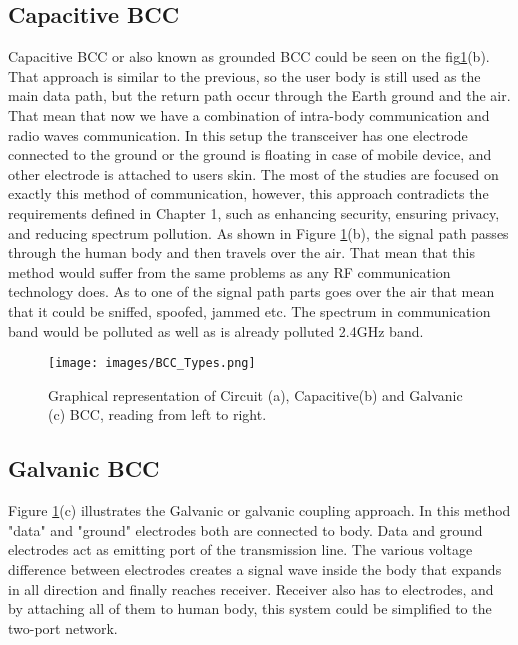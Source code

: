 {\begin{table}
\begin{minipage}[b]{\hsize}
      \label{tab:comparing_solutions} 
      \end{minipage}
\end{table}


\subsection{Capacitive BCC}




\quad Capacitive BCC or also known as grounded BCC could be seen on the fig\ref{fig:bcc_types}(b). That approach is similar to the previous, so the user body is still used as the main data path, but the return path occur through the Earth ground and the air. That mean that now we have a combination of intra-body communication and radio waves communication. In this setup the transceiver has one electrode connected to the ground or the ground is floating in case of mobile device, and other electrode is attached to users skin. The most of the studies are focused on exactly this method of communication, however, this approach contradicts the requirements defined in Chapter 1, such as enhancing security, ensuring privacy, and reducing spectrum pollution. As shown in Figure \ref{fig:bcc_types}(b), the signal path passes through the human body and then travels over the air. That mean that this method would suffer from the same problems as any RF communication technology does. As to one of the signal path parts goes over the air that mean that it could be sniffed, spoofed, jammed etc. The spectrum in communication band would be polluted as well as is already polluted 2.4GHz band.





\begin{figure}[!h]
    \centering
    \texttt{[image: images/BCC\_Types.png]}
    \caption{Graphical representation of Circuit (a), Capacitive(b) and Galvanic (c) BCC, reading from left to right. \cite{imp_of_bcc}}
    \label{fig:bcc_types}
\end{figure}

\subsection{Galvanic BCC}
\quad Figure \ref{fig:bcc_types}(c) illustrates the Galvanic or galvanic coupling approach. In this method "data" and "ground" electrodes both are connected to body. Data and ground electrodes act as emitting port of the transmission line. The various voltage difference between electrodes creates a signal wave inside the body that expands in all direction and finally reaches receiver. Receiver also has to electrodes, and by attaching all of them to human body, this system could be simplified to the two-port network.

}
